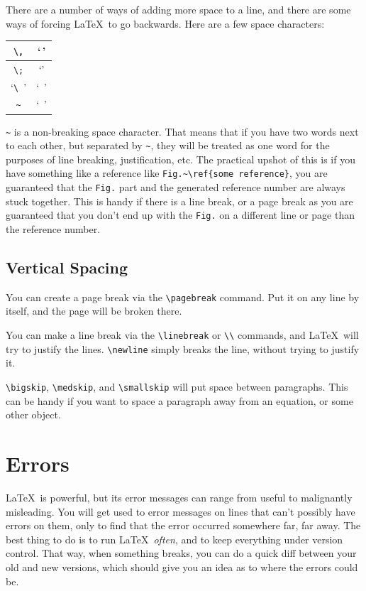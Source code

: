 \documentclass[letterpaper]{article}
\begin{document}
There are a number of ways of adding more space to a line, and there are 
some ways of forcing \LaTeX\ to go backwards.  Here are a few space 
characters: 
\bigskip

\begin{tabular}{|c|c|} \hline 
\verb+\,+       & `\,'  \\ \hline
\verb+\;+       & `\;'  \\ \hline
`\verb+\ +'     & `\ '  \\ \hline
\verb+~+        & `~'   \\ \hline
\end{tabular}

\bigskip
\noindent
\verb+~+ is a non-breaking space character.  That means that if you have
two words next to each other, but separated by \verb+~+, they will be
treated as one word for the purposes of line breaking, justification, etc.
The practical upshot of this is if you have something like a reference
like \verb+Fig.~\ref{some reference}+, you are guaranteed that the
\verb+Fig.+ part and the generated reference number are always stuck
together.  This is handy if there is a line break, or a page break as you
are guaranteed that you don't end up with the \verb+Fig.+ on a different
line or page than the reference number.

\subsection{Vertical Spacing}

You can create a page break via the \verb+\pagebreak+ command.  Put it 
on any line by itself, and the page will be broken there.

You can make a line break via the \verb+\linebreak+ or \verb+\\+ 
commands, and \LaTeX\ will try to justify the lines.  \verb+\newline+ simply 
breaks the line, without trying to justify it.

\verb+\bigskip+, \verb+\medskip+, and \verb+\smallskip+ will put space 
between paragraphs.  This can be handy if you want to space a paragraph 
away from an equation, or some other object.

\section{Errors}

\LaTeX\ is powerful, but its error messages can range from useful to 
malignantly misleading.  You will get used to error messages on lines 
that can't possibly have errors on them, only to find that the error 
occurred somewhere far, far away.  The best thing to do is to run 
\LaTeX\ \emph{often}, and to keep everything under version control.  
That way, when something breaks, you can do a quick diff between your 
old and new versions, which should give you an idea as to where the 
errors could be.
\end{document}
